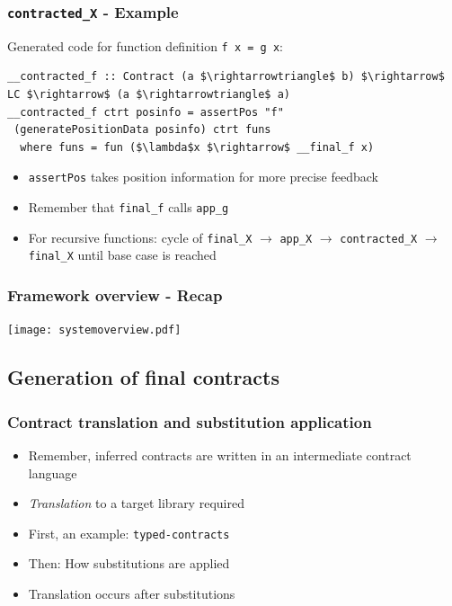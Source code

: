 \documentclass[]{beamer}
\begin{document}
\begin{frame}[fragile]
\frametitle{\texttt{\underline{\hspace{1.5em}}contracted\_X} - Example}

Generated code for function definition \texttt{f x = g x}:
\begin{lstlisting}[mathescape]
__contracted_f :: Contract (a $\rightarrowtriangle$ b) $\rightarrow$ LC $\rightarrow$ (a $\rightarrowtriangle$ a)
__contracted_f ctrt posinfo = assertPos "f" 
 (generatePositionData posinfo) ctrt funs
  where funs = fun ($\lambda$x $\rightarrow$ __final_f x)
\end{lstlisting}

\begin{itemize}
	\item \texttt{assertPos} takes position information for more precise feedback
	\item Remember that \texttt{\underline{\hspace{1.5em}}final\_f} calls \texttt{\underline{\hspace{1.5em}}app\_g}
	\item For recursive functions: cycle of \texttt{\underline{\hspace{1.5em}}final\_X} $\rightarrow$ \texttt{\underline{\hspace{1.5em}}app\_X} $\rightarrow$ \texttt{\underline{\hspace{1.5em}}contracted\_X} $\rightarrow$ \texttt{\underline{\hspace{1.5em}}final\_X} until base case is reached
\end{itemize}

\end{frame}

\begin{frame}
\frametitle{Framework overview - Recap}

\begin{center}
\texttt{[image: systemoverview.pdf]}
\end{center}

\end{frame}

\subsection{Generation of final contracts}

\begin{frame}
\frametitle{Contract translation and substitution application}

\begin{itemize}
	\item Remember, inferred contracts are written in an intermediate contract language
	\item \emph{Translation} to a target library required
	\item First, an example: \texttt{typed-contracts}
	\item Then: How substitutions are applied
	\item Translation occurs after substitutions
\end{itemize}

\end{frame}
\end{document}
